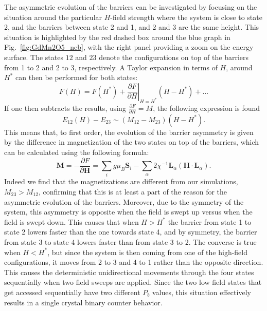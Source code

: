 The asymmetric evolution of the barriers can be investigated by focusing on the situation around the particular $H$-field strength where the system is close to state 2, and the barriers between state 2 and 1, and 2 and 3 are the same height.
This situation is highlighted by the red dashed box around the blue graph in Fig.~\ref{fig:GdMn2O5_neb}, with the right panel providing a zoom on the energy surface. The states $12$ and $23$ denote the configurations on top of the barriers from 1 to 2 and 2 to 3, respectively. A Taylor expansion in terms of $H$, around $H^*$ can then be performed for both states:
\begin{equation}
	F(H) = F(H^*) + \left.\frac{\partial F}{\partial H}\right\rvert_{H=H^*} (H-H^*) + ...
\end{equation}
If one then subtracts the results, using $\frac{\partial F}{\partial H} = M$, the following expression is found
\begin{equation}
	E_{12}(H) - E_{23} \sim (M_{12} - M_{23}) (H - H^*).
\end{equation}
This means that, to first order, the evolution of the barrier asymmetry is given by the difference in magnetization of the two states on top of the barriers, which can be calculated using the following formula:
\begin{equation}
	\mathbf{M} = -\frac{\partial{F}}{\partial{\mathbf{H}}} = \sum_i g \mu_{B} \mathbf{S}_i - \sum_{\alpha} 2 \chi^{-1}\mathbf{L}_{\alpha} (\mathbf{H} \cdot \mathbf{L}_{\alpha}). 
\end{equation}
Indeed we find that the magnetizations are different from our simulations, $M_{23} > M_{12}$, confirming that this is at least a part of the reason for the asymmetric evolution of the barriers.
Moreover, due to the symmetry of the system, this asymmetry is opposite when the field is swept up versus when the field is swept down.
This causes that when $H > H^*$ the barrier from state 1 to state 2 lowers faster than the one towards state 4, and by symmetry, the barrier from state 3 to state 4 lowers faster than from state 3 to 2.
The converse is true when $H < H^*$, but since the system is then coming from one of the high-field configurations, it moves from 2 to 3 and 4 to 1 rather than the opposite direction.
This causes the deterministic unidirectional movements through the four states sequentially when two field sweeps are applied.
Since the two low field states that get accessed sequentially have two different $P_b$ values, this situation effectively results in a single crystal binary counter behavior.  

